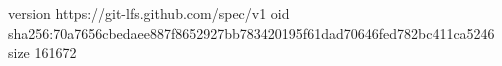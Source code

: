 version https://git-lfs.github.com/spec/v1
oid sha256:70a7656cbedaee887f8652927bb783420195f61dad70646fed782bc411ca5246
size 161672
